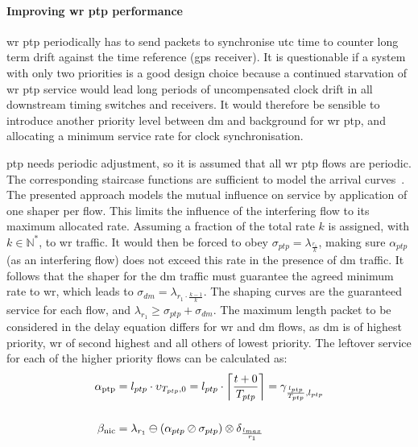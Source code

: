 \paragraph{Improving \gls{wr} \gls{ptp} performance}
\gls{wr} \gls{ptp} periodically has to send packets to synchronise \gls{utc} time to counter long term drift against the time reference (\gls{gps} receiver).
It is questionable if a system with only two priorities is a good design choice because a continued starvation of \gls{wr} \gls{ptp} service would lead
long periods of uncompensated clock drift in all downstream timing switches and receivers. 
It would therefore be sensible to introduce another priority level between \gls{dm} and background for \gls{wr} \gls{ptp}, and allocating a minimum service rate for clock synchronisation.
\par
\gls{ptp} needs periodic adjustment, so it is assumed that all \gls{wr} \gls{ptp} flows are periodic. The corresponding staircase functions are sufficient to model the arrival curves~\cite[p. 8]{thiran_network_2001}.
The presented approach models the mutual influence on service by application of one shaper per flow. This limits the influence of the interfering flow to its maximum allocated rate.
Assuming a fraction of the total rate $k$ is assigned, with  $k \in \mathbb{N^*}$, to \gls{wr} traffic. It would then be forced to obey $\sigma_{ptp} = \lambda_{\frac{r_1}{k}}$, making sure $\alpha_{ptp}$ (as an interfering flow)
does not exceed this rate in the presence of \gls{dm} traffic. It follows that the shaper for the \gls{dm} traffic must guarantee the agreed minimum rate to \gls{wr}, which leads to $\sigma_{dm} = \lambda_{r_1 \cdot \frac{k-1}{k}}$.
The shaping curves are the guaranteed service for each flow, and $\lambda_{r_1} \ge \sigma_{ptp} + \sigma_{dm}$.
The maximum length packet to be considered in the delay equation differs for \gls{wr} and \gls{dm} flows, as \gls{dm} is of highest priority, \gls{wr} of second highest and all others of lowest priority.
The leftover service for each of the higher priority flows can be calculated as:
%
\begin{align}
\mathrm{\alpha_{ptp}} &= l_{ptp} \cdot \upsilon_{T_{ptp},0} = l_{ptp} \cdot \left \lceil \frac{t+0}{T_{ptp}} \right \rceil = \gamma_{\frac{l_{ptp}}{T_{ptp}}, l_{ptp}}\\
\notag\\
\mathrm{\beta_{nic}} &= \lambda_{r_1} \ominus (\alpha_{ptp} \oslash \sigma_{ptp}) \otimes \delta_{\frac{l_{max}}{r_1}}%
\end{align}


